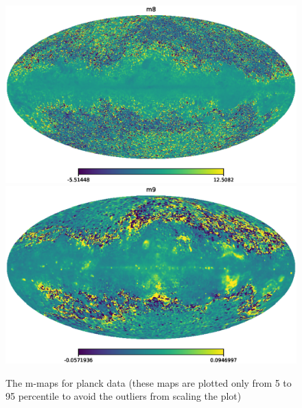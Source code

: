 \begin{figure}[htbp]
 \includegraphics[width=\mwidths]{m-maps/map_m8.eps}
 \includegraphics[width=\mwidths]{m-maps/map_m9.eps}
 \caption{The m-maps for planck data (these maps are plotted only from 5 to 95
   percentile to avoid the outliers from scaling the plot)}
\end{figure}
